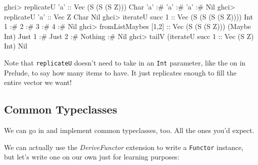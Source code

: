 \documentclass[]{article}
\newenvironment{Shaded}{}{}
\newcommand{\DataTypeTok}[1]{\textcolor[rgb]{0.56,0.13,0.00}{{#1}}}
\newcommand{\DecValTok}[1]{\textcolor[rgb]{0.25,0.63,0.44}{{#1}}}
\newcommand{\CharTok}[1]{\textcolor[rgb]{0.25,0.44,0.63}{{#1}}}
\newcommand{\OtherTok}[1]{\textcolor[rgb]{0.00,0.44,0.13}{{#1}}}
\newcommand{\FunctionTok}[1]{\textcolor[rgb]{0.02,0.16,0.49}{{#1}}}
\newcommand{\NormalTok}[1]{{#1}}
\begin{document}
\begin{Shaded}
\begin{Highlighting}[]
\NormalTok{ghci}\FunctionTok{>} \NormalTok{replicateU }\CharTok{'a'}\OtherTok{       ::} \DataTypeTok{Vec} \NormalTok{(}\DataTypeTok{S} \NormalTok{(}\DataTypeTok{S} \NormalTok{(}\DataTypeTok{S} \DataTypeTok{Z}\NormalTok{))) }\DataTypeTok{Char}
\CharTok{'a'} \FunctionTok{:#} \CharTok{'a'} \FunctionTok{:#} \CharTok{'a'} \FunctionTok{:#} \DataTypeTok{Nil}
\NormalTok{ghci}\FunctionTok{>} \NormalTok{replicateU }\CharTok{'a'}\OtherTok{       ::} \DataTypeTok{Vec} \DataTypeTok{Z} \DataTypeTok{Char}
\DataTypeTok{Nil}
\NormalTok{ghci}\FunctionTok{>} \NormalTok{iterateU succ }\DecValTok{1}\OtherTok{      ::} \DataTypeTok{Vec} \NormalTok{(}\DataTypeTok{S} \NormalTok{(}\DataTypeTok{S} \NormalTok{(}\DataTypeTok{S} \NormalTok{(}\DataTypeTok{S} \DataTypeTok{Z}\NormalTok{)))) }\DataTypeTok{Int}
\DecValTok{1} \FunctionTok{:#} \DecValTok{2} \FunctionTok{:#} \DecValTok{3} \FunctionTok{:#} \DecValTok{4} \FunctionTok{:#} \DataTypeTok{Nil}
\NormalTok{ghci}\FunctionTok{>} \NormalTok{fromListMaybes [}\DecValTok{1}\NormalTok{,}\DecValTok{2}\NormalTok{]}\OtherTok{ ::} \DataTypeTok{Vec} \NormalTok{(}\DataTypeTok{S} \NormalTok{(}\DataTypeTok{S} \NormalTok{(}\DataTypeTok{S} \DataTypeTok{Z}\NormalTok{))) (}\DataTypeTok{Maybe} \DataTypeTok{Int}\NormalTok{)}
\DataTypeTok{Just} \DecValTok{1} \FunctionTok{:#} \DataTypeTok{Just} \DecValTok{2} \FunctionTok{:#} \DataTypeTok{Nothing} \FunctionTok{:#} \DataTypeTok{Nil}
\NormalTok{ghci}\FunctionTok{>} \NormalTok{tailV (iterateU succ }\DecValTok{1}\OtherTok{ ::} \DataTypeTok{Vec} \NormalTok{(}\DataTypeTok{S} \DataTypeTok{Z}\NormalTok{) }\DataTypeTok{Int}\NormalTok{)}
\DataTypeTok{Nil}
\end{Highlighting}
\end{Shaded}

Note that \texttt{replicateU} doesn't need to take in an \texttt{Int}
parameter, like the on in Prelude, to say how many items to have. It
just replicates enough to fill the entire vector we want!

\subsection{Common Typeclasses}\label{common-typeclasses}

We can go in and implement common typeclasses, too. All the ones you'd
expect.

We can actually use the \emph{DeriveFunctor} extension to write a
\texttt{Functor} instance, but let's write one on our own just for
learning purposes:
\end{document}
